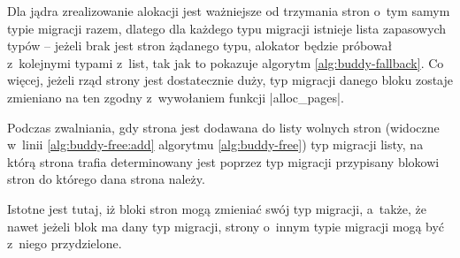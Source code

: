 Dla jądra zrealizowanie alokacji jest ważniejsze od trzymania stron
o~tym samym typie migracji razem, dlatego dla każdego typu migracji
istnieje lista zapasowych typów -- jeżeli brak jest stron żądanego
typu, alokator będzie próbował z~kolejnymi typami z~list, tak jak to
pokazuje algorytm \ref{alg:buddy-fallback}.  Co więcej, jeżeli rząd
strony jest dostatecznie duży, typ migracji danego bloku zostaje
zmieniano na ten zgodny z~wywołaniem funkcji \code|alloc_pages|.

Podczas zwalniania, gdy strona jest dodawana do listy wolnych stron
(widoczne w~linii \ref{alg:buddy-free:add} algorytmu
\ref{alg:buddy-free}) typ migracji listy, na którą strona trafia
determinowany jest poprzez typ migracji przypisany blokowi stron do
którego dana strona należy.

Istotne jest tutaj, iż bloki stron mogą zmieniać swój typ migracji,
a~także, że nawet jeżeli blok ma dany typ migracji, strony o~innym
typie migracji mogą być z~niego przydzielone.
